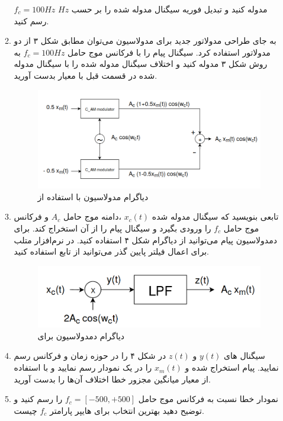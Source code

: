 \documentclass[14pt, professionalfont]{article}
\begin{document}
\begin{enumerate}
\begin{enumerate}
		$f_c = 100 Hz$
		\:
		مدوله کنید و تبدیل فوریه سیگنال مدوله شده را بر حسب 
		$Hz$
		رسم کنید.
		\item 
		به جای طراحی مدولاتور جدید برای مدولاسیون 
		\:
		\:
		می‌توان مطابق شکل ۳ از دو مدولاتور 
		\:
		\:
		استفاده کرد. سیگنال پیام را با فرکانس موج حامل  
		\:
		$f_c = 100 Hz$
		\:
		به روش شکل ۳ مدوله کنید و اختلاف سیگنال مدوله شده را با سیگنال مدوله شده در قسمت قبل با معیار 
		\:
		\:
		بدست آورید.
			\begin{figure}[h]
			\centering
			\includegraphics[scale = 0.25]{../images/dsb2am.png}
			\caption{دیاگرام مدولاسیون
				\:\:
				با استفاده از 
				\:}
		\end{figure}
		\item
		تابعی بنویسید که سیگنال مدوله شده 
		\:
		$x_c(t)$
		\:
		،دامنه موج حامل 
		\:
		$A_c$
		\:
		و فرکانس موج حامل 
		\:
		$f_c$
		\:
		را ورودی بگیرد و سیگنال پیام را از آن استخراج کند. برای دمدولاسیون پیام می‌توانید از دیاگرام شکل ۴ استفاده کنید. در نرم‌افزار متلب برای اعمال فیلتر پایین گذر می‌توانید از تابع 
		\:
		\:
		استفاده کنید. 
		\begin{figure}[h]
			\centering
			\includegraphics[scale = 0.25]{../images/dsbdemod.png}
			\caption{
				دیاگرام دمدولاسیون برای 
			}
		\end{figure}
		
	\item 
	سیگنال های
	\:
	$y(t)$
	\:
	و 
	\:
	$z(t)$
	\:
	در شکل ۴ را در حوزه زمان و فرکانس رسم نمایید. پیام استخراج شده
	و
	\:
	$x_m(t)$
	\: را در یک نمودار رسم نمایید و  با استفاده از معیار میانگین مجزور خطا
	\:
	\:
	اختلاف آن‌ها را بدست آورید.
	\item
	نمودار خطا 
	\:
	\:
	نسبت به فرکانس موج حامل
	\:
	$f_c = [-500 , +500]$
	\:
	را رسم کنید و توضیح دهید بهترین انتخاب برای هایپر پارامتر 
	\:
	$f_c$
	\:
	چیست.
	

\end{enumerate}
\end{enumerate}
\end{document}

